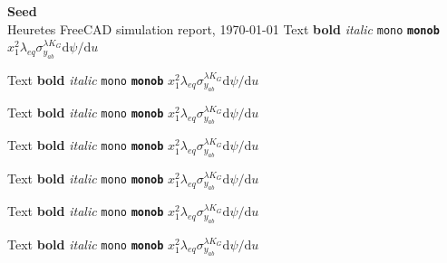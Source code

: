 \documentclass[10pt,a4paper]{article}
\begin{document}
{\Large\bfseries Seed}\\[2pt]
{\small\color{black!60} Heuretes FreeCAD simulation report, \today}
{\tiny Text \textbf{bold} \textit{italic} \texttt{mono} \textbf{\texttt{monob}} $x_1^2\lambda_{eq} \sigma_{y_{ab}}^{\lambda K_G} \mathrm{d}\psi/\mathrm{d}u$}\par
{\scriptsize Text \textbf{bold} \textit{italic} \texttt{mono} \textbf{\texttt{monob}} $x_1^2\lambda_{eq} \sigma_{y_{ab}}^{\lambda K_G} \mathrm{d}\psi/\mathrm{d}u$}\par
{\footnotesize Text \textbf{bold} \textit{italic} \texttt{mono} \textbf{\texttt{monob}} $x_1^2\lambda_{eq} \sigma_{y_{ab}}^{\lambda K_G} \mathrm{d}\psi/\mathrm{d}u$}\par
{\small Text \textbf{bold} \textit{italic} \texttt{mono} \textbf{\texttt{monob}} $x_1^2\lambda_{eq} \sigma_{y_{ab}}^{\lambda K_G} \mathrm{d}\psi/\mathrm{d}u$}\par
{\normalsize Text \textbf{bold} \textit{italic} \texttt{mono} \textbf{\texttt{monob}} $x_1^2\lambda_{eq} \sigma_{y_{ab}}^{\lambda K_G} \mathrm{d}\psi/\mathrm{d}u$}\par
{\large Text \textbf{bold} \textit{italic} \texttt{mono} \textbf{\texttt{monob}} $x_1^2\lambda_{eq} \sigma_{y_{ab}}^{\lambda K_G} \mathrm{d}\psi/\mathrm{d}u$}\par
{\Large Text \textbf{bold} \textit{italic} \texttt{mono} \textbf{\texttt{monob}} $x_1^2\lambda_{eq} \sigma_{y_{ab}}^{\lambda K_G} \mathrm{d}\psi/\mathrm{d}u$}\par
\end{document}
